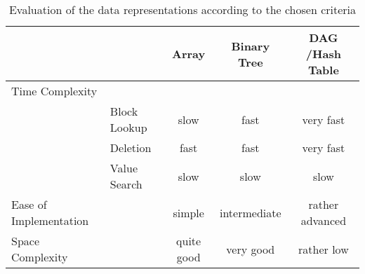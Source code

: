 \documentclass[a4paper,11pt,twoside]{article}
\begin{document}
\begin{table}[]
\centering
\caption{Evaluation of the data representations according to the chosen criteria}
\label{tab:eval}
\begin{tabular}{llccc}
                       &              & Array      & Binary Tree  &
                       DAG /Hash Table \\ \hline
Time Complexity        &              &            &              &
\\
                       & Block Lookup & slow       & fast         &
                       very fast       \\
                       & Deletion     & fast       & fast         &
                       very fast       \\
                       & Value Search & slow       & slow         &
                       slow            \\
Ease of Implementation &              & simple     & intermediate &
rather advanced \\
Space Complexity       &              & quite good & very good    &
rather low     
\end{tabular}
\end{table}


\end{document}
